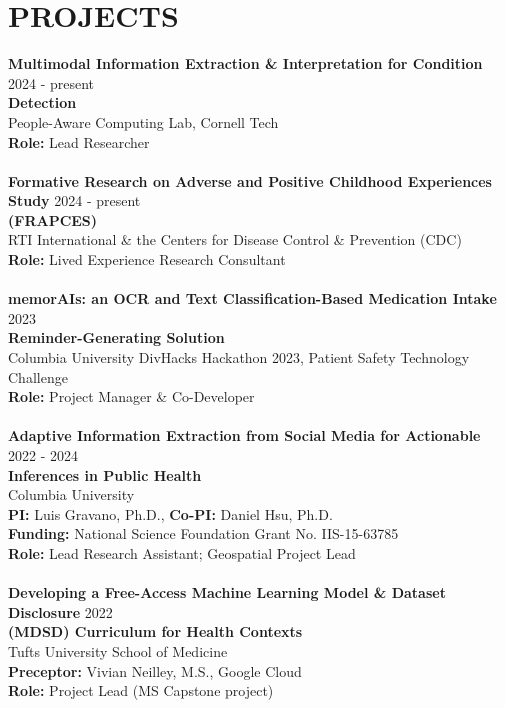 \documentclass[a4paper,12pt]{article}
\begin{document}
{\section*{PROJECTS}
\textbf{Multimodal Information Extraction \& Interpretation for  Condition} \hfill 2024 - present \\ \textbf{Detection} \\
People-Aware Computing Lab, Cornell Tech \\
\textbf{Role:} Lead Researcher\\
\\
\textbf{Formative Research on Adverse and Positive Childhood Experiences Study} \hfill 2024 - present\\ \textbf{(FRAPCES)}\\
RTI International \& the Centers for Disease Control \& Prevention (CDC)\\
\textbf{Role:} Lived Experience Research Consultant\\
\\
\textbf{memorAIs: an OCR and Text Classification-Based Medication Intake} \hfill 2023 \\ \textbf{Reminder-Generating Solution} \\
Columbia University DivHacks Hackathon 2023, Patient Safety Technology Challenge\\
\textbf{Role:} Project Manager \& Co-Developer\\
\\
\textbf{Adaptive Information Extraction from Social Media for Actionable} \hfill 2022 - 2024 \\ \textbf{Inferences in Public Health} \\
Columbia University\\
\textbf{PI:}  Luis Gravano, Ph.D., \textbf{Co-PI:}  Daniel Hsu, Ph.D.\\
\textbf{Funding:}  National Science Foundation Grant No. IIS-15-63785\\
\textbf{Role:} Lead Research Assistant; Geospatial Project Lead\\
\\
\textbf{Developing a Free-Access Machine Learning Model \& Dataset Disclosure} \hfill 2022 \\ \textbf{(MDSD) Curriculum for Health Contexts} \\
Tufts University School of Medicine\\
\textbf{Preceptor:}   Vivian Neilley, M.S., Google Cloud\\
\textbf{Role:} Project Lead (MS Capstone project)\\
}
\end{document}
